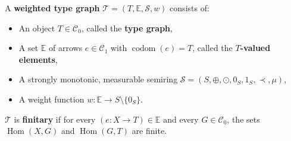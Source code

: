 \begin{definition}
    \label{def:weighted_type_graph}
    A \textbf{weighted type graph} \(\mathcal{T} = (T, \mathbb{E}, \mathcal{S}, w)\) consists of:
    \begin{itemize}
        \item An object \(T \in \mathcal{C}_0\), called the \textbf{type graph},
        \item A set \(\mathbb{E}\) of arrows \(e \in \mathcal{C}_1\) with \(\operatorname{codom}(e) = T\), called the \textbf{\(T\)-valued elements}, 
        \item A strongly monotonic, measurable semiring \(\mathcal{S}=(S, \oplus, \odot, 0_S, 1_S, \prec, \mu)\),
        \item A weight function \(w : \mathbb{E} \to S \setminus \{0_S\}\).
    \end{itemize}
    \(\mathcal{T}\) is \textbf{finitary} if for every \((e:X \to T) \in \mathbb{E}\) and every \(G \in \mathcal{C}_0\), the sets \(\operatorname{Hom}(X, G)\) and \(\operatorname{Hom}(G, T)\) are finite.
\end{definition}